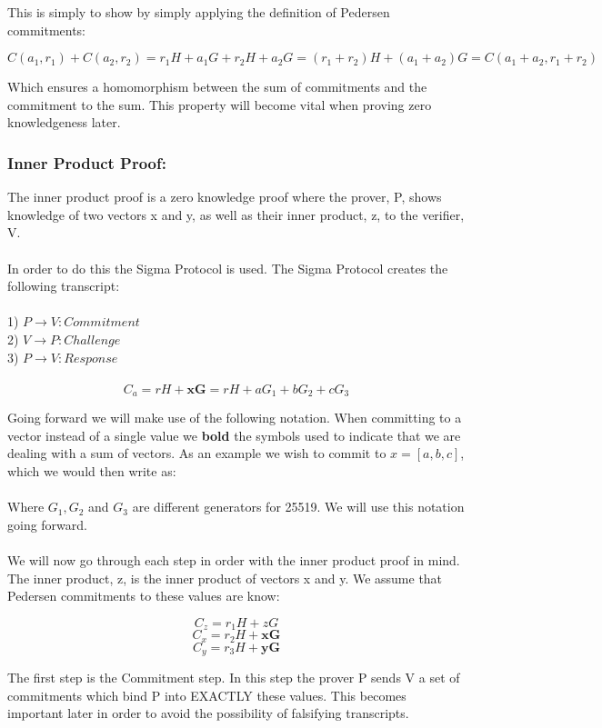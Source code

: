 \documentclass{article}
\begin{document}
\noindent This is simply to show by simply applying the definition of Pedersen commitments: 

$$C(a_1,r_1) + C(a_2,r_2) = r_1H + a_1G + r_2H + a_2G = (r_1 + r_2)H + (a_1 + a_2)G = C(a_1+a_2,r_1+r_2)$$

\noindent Which ensures a homomorphism between the sum of commitments and the commitment to the sum. This property will become vital when proving zero knowledgeness later. 

\subsubsection{Inner Product Proof:}

The inner product proof is a zero knowledge proof where the prover, P, shows knowledge of two vectors x and y, as well as their inner product, z, to the verifier, V. 
\\\\
In order to do this the Sigma Protocol is used. The Sigma Protocol creates the following transcript: 
\\\\
1) $P \rightarrow V: Commitment$
\\
2) $V \rightarrow P: Challenge$
\\
3) $P \rightarrow V: Response$
\\\\
$$C_a = rH + \mathbf{xG} = rH + aG_1 + bG_2 + cG_3$$

\noindent Going forward we will make use of the following notation. When committing to a vector instead of a single value we \textbf{bold} the symbols used to indicate that we are dealing with a sum of vectors. As an example we wish to commit to $x = [a,b,c]$, which we would then write as:\\\\
\noindent Where $G_1, G_2$ and $G_3$ are different generators for 25519. We will use this notation going forward.
\\\\
We will now go through each step in order with the inner product proof in mind. The inner product, z, is the inner product of vectors x and y. We assume that Pedersen commitments to these values are know:

$$C_z = r_1H + zG$$
$$C_x = r_2H + \mathbf{xG}$$
$$C_y = r_3H + \mathbf{yG}$$

\noindent The first step is the Commitment step. In this step the prover P sends V a set of commitments which bind P into EXACTLY these values. This becomes important later in order to avoid the possibility of falsifying transcripts. 
\end{document}
